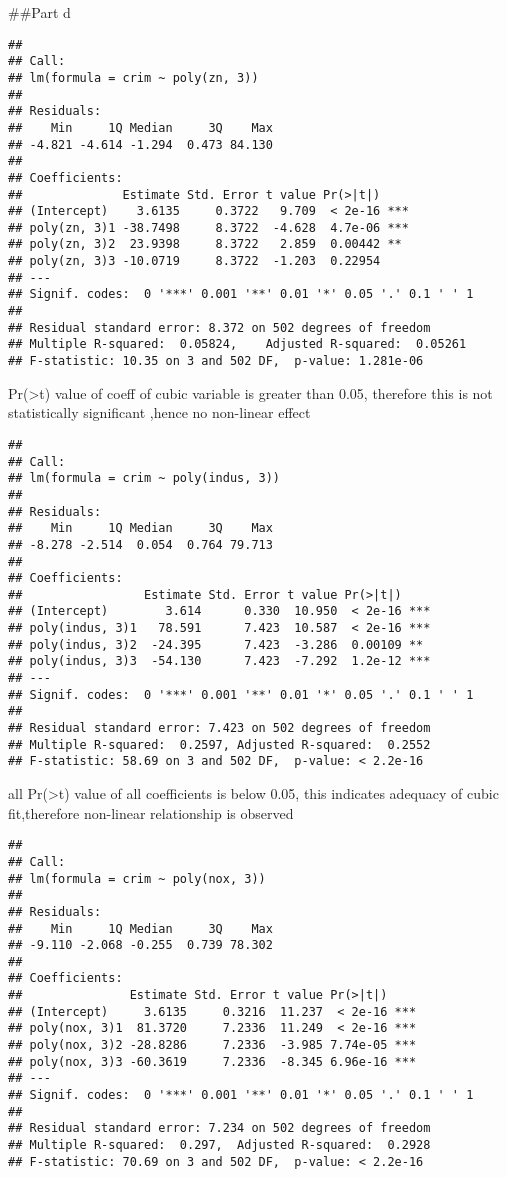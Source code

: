 \documentclass[
]{article}
\begin{document}
\#\#Part d

\begin{verbatim}
## 
## Call:
## lm(formula = crim ~ poly(zn, 3))
## 
## Residuals:
##    Min     1Q Median     3Q    Max 
## -4.821 -4.614 -1.294  0.473 84.130 
## 
## Coefficients:
##              Estimate Std. Error t value Pr(>|t|)    
## (Intercept)    3.6135     0.3722   9.709  < 2e-16 ***
## poly(zn, 3)1 -38.7498     8.3722  -4.628  4.7e-06 ***
## poly(zn, 3)2  23.9398     8.3722   2.859  0.00442 ** 
## poly(zn, 3)3 -10.0719     8.3722  -1.203  0.22954    
## ---
## Signif. codes:  0 '***' 0.001 '**' 0.01 '*' 0.05 '.' 0.1 ' ' 1
## 
## Residual standard error: 8.372 on 502 degrees of freedom
## Multiple R-squared:  0.05824,    Adjusted R-squared:  0.05261 
## F-statistic: 10.35 on 3 and 502 DF,  p-value: 1.281e-06
\end{verbatim}

Pr(\textgreater\textbar t\textbar) value of coeff of cubic variable is
greater than 0.05, therefore this is not statistically significant
,hence no non-linear effect

\begin{verbatim}
## 
## Call:
## lm(formula = crim ~ poly(indus, 3))
## 
## Residuals:
##    Min     1Q Median     3Q    Max 
## -8.278 -2.514  0.054  0.764 79.713 
## 
## Coefficients:
##                 Estimate Std. Error t value Pr(>|t|)    
## (Intercept)        3.614      0.330  10.950  < 2e-16 ***
## poly(indus, 3)1   78.591      7.423  10.587  < 2e-16 ***
## poly(indus, 3)2  -24.395      7.423  -3.286  0.00109 ** 
## poly(indus, 3)3  -54.130      7.423  -7.292  1.2e-12 ***
## ---
## Signif. codes:  0 '***' 0.001 '**' 0.01 '*' 0.05 '.' 0.1 ' ' 1
## 
## Residual standard error: 7.423 on 502 degrees of freedom
## Multiple R-squared:  0.2597, Adjusted R-squared:  0.2552 
## F-statistic: 58.69 on 3 and 502 DF,  p-value: < 2.2e-16
\end{verbatim}

all Pr(\textgreater\textbar t\textbar) value of all coefficients is
below 0.05, this indicates adequacy of cubic fit,therefore non-linear
relationship is observed

\begin{verbatim}
## 
## Call:
## lm(formula = crim ~ poly(nox, 3))
## 
## Residuals:
##    Min     1Q Median     3Q    Max 
## -9.110 -2.068 -0.255  0.739 78.302 
## 
## Coefficients:
##               Estimate Std. Error t value Pr(>|t|)    
## (Intercept)     3.6135     0.3216  11.237  < 2e-16 ***
## poly(nox, 3)1  81.3720     7.2336  11.249  < 2e-16 ***
## poly(nox, 3)2 -28.8286     7.2336  -3.985 7.74e-05 ***
## poly(nox, 3)3 -60.3619     7.2336  -8.345 6.96e-16 ***
## ---
## Signif. codes:  0 '***' 0.001 '**' 0.01 '*' 0.05 '.' 0.1 ' ' 1
## 
## Residual standard error: 7.234 on 502 degrees of freedom
## Multiple R-squared:  0.297,  Adjusted R-squared:  0.2928 
## F-statistic: 70.69 on 3 and 502 DF,  p-value: < 2.2e-16
\end{verbatim}
\end{document}
